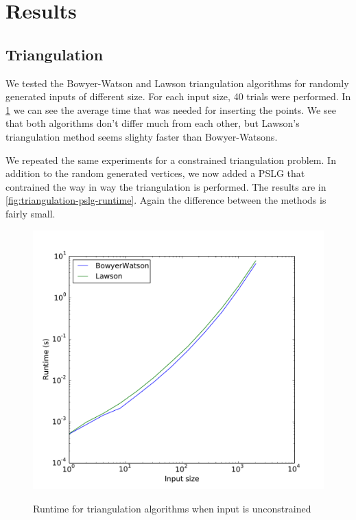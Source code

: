 \section{Results}
\label{sec:results}

\subsection{Triangulation}
\label{sub:triangulation}

We tested the Bowyer-Watson and Lawson triangulation algorithms for randomly generated inputs of different size.
For each input size, 40 trials were performed.
In \ref{fig:triangulation-runtime} we can see the average time that was needed for inserting the points.
We see that both algorithms don't differ much from each other, but Lawson's triangulation method seems slighty faster than Bowyer-Watsons.

We repeated the same experiments for a constrained triangulation problem.
In addition to the random generated vertices, we now added a PSLG that contrained the way in way the triangulation is performed.
The results are in \ref{fig:triangulation-pslg-runtime}.
Again the difference between the methods is fairly small.

\begin{figure}
    \includegraphics[width=\columnwidth]{../images/runtime.pdf}
    \label{fig:triangulation-runtime}
    \caption{Runtime for triangulation algorithms when input is unconstrained}
\end{figure}

